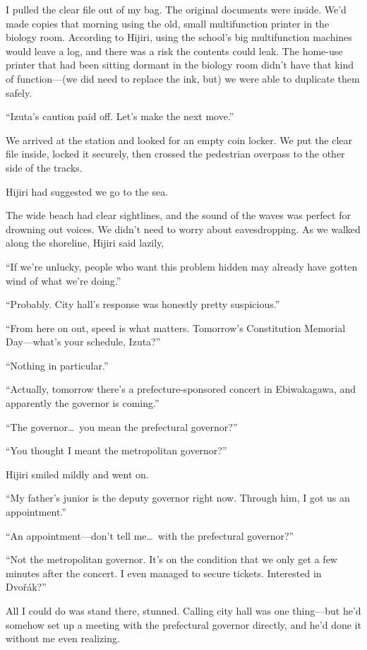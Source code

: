 \documentclass[
    a4paper,
    12pt,
    twoside,
    openany,
    UTF8,
    fontset=windows
]{ctexbook}
\begin{document}
I pulled the clear file out of my bag. The original documents were inside. We'd made copies that morning using the old, small multifunction printer in the biology room. According to Hijiri, using the school's big multifunction machines would leave a log, and there was a risk the contents could leak. The home-use printer that had been sitting dormant in the biology room didn't have that kind of function---(we did need to replace the ink, but) we were able to duplicate them safely.

``Izuta's caution paid off. Let's make the next move.''

We arrived at the station and looked for an empty coin locker. We put the clear file inside, locked it securely, then crossed the pedestrian overpass to the other side of the tracks.

Hijiri had suggested we go to the sea.

The wide beach had clear sightlines, and the sound of the waves was perfect for drowning out voices. We didn't need to worry about eavesdropping. As we walked along the shoreline, Hijiri said lazily,

``If we're unlucky, people who want this problem hidden may already have gotten wind of what we're doing.''

``Probably. City hall's response was honestly pretty suspicious.''

``From here on out, speed is what matters. Tomorrow's Constitution Memorial Day---what's your schedule, Izuta?''

``Nothing in particular.''

``Actually, tomorrow there's a prefecture-sponsored concert in Ebiwakagawa, and apparently the governor is coming.''

``The governor\dots\ you mean the prefectural governor?''

``You thought I meant the metropolitan governor?''

Hijiri smiled mildly and went on.

``My father's junior is the deputy governor right now. Through him, I got us an appointment.''

``An appointment---don't tell me\dots\ with the prefectural governor?''

``Not the metropolitan governor. It's on the condition that we only get a few minutes after the concert. I even managed to secure tickets. Interested in Dvo\v{r}\'ak?''

All I could do was stand there, stunned. Calling city hall was one thing---but he'd somehow set up a meeting with the prefectural governor directly, and he'd done it without me even realizing.
\end{document}
